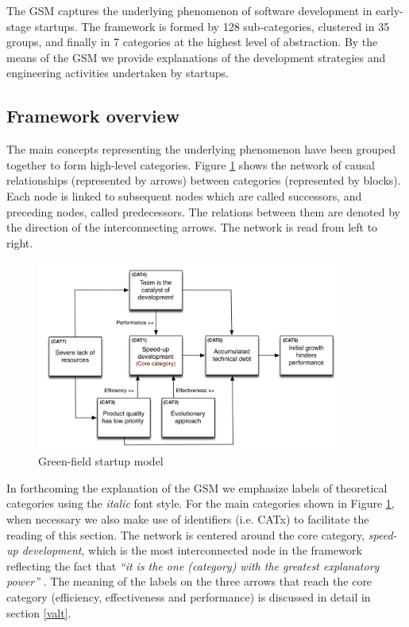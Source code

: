 \documentclass[10pt,journal,letterpaper,compsoc]{IEEEtran}
\begin{document}
The GSM captures the underlying phenomenon of software development in 
early-stage startups. The framework is formed by 128 sub-categories, clustered 
in 35 groups, and finally in 7 categories at the highest level of abstraction. 
By the means of the GSM we provide explanations of the development strategies 
and engineering activities undertaken by startups.
\subsection{Framework overview}
\label{res:gsm:frmov}
The main concepts representing the underlying phenomenon have been grouped 
together to form high-level categories. Figure \ref{fig:gsm} shows the network 
of causal relationships (represented by arrows) between categories (represented 
by blocks). Each node is linked to subsequent nodes which are called successors, 
and preceding nodes, called predecessors. The relations between them are denoted 
by the direction of the interconnecting arrows. The network is read from left to 
right.

\begin{figure}[!t]
\centering
\includegraphics[width=4in]{figures/high-level}
\caption{Green-field startup model}\label{fig:gsm}
\end{figure}

In forthcoming the explanation of the GSM we emphasize labels of theoretical 
categories using the \textit{italic} font style. For the main categories shown 
in Figure \ref{fig:gsm}, when necessary we also make use of identifiers (i.e. 
CATx) to facilitate the reading of this section.
The network is centered around the core category, \textit{speed-up 
development}, which is the most interconnected node in the framework reflecting 
the fact that \textit{``it is the one (category) with the greatest explanatory 
power''}  \cite{Strauss1998}. The meaning of the labels on the three arrows that 
reach the core category (efficiency, effectiveness and performance) is discussed 
in detail in section \ref{valt}. %
\end{document}
